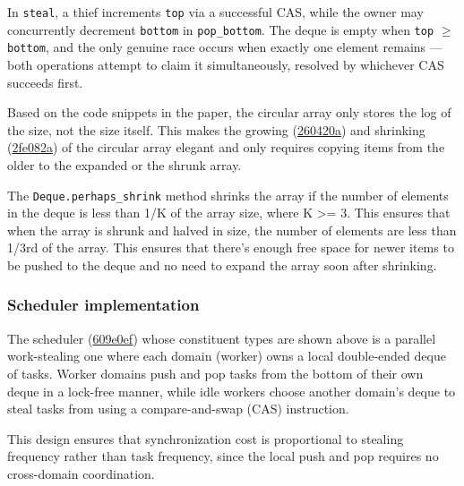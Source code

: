 \documentclass[11pt,a4paper]{article}
\begin{document}
In \texttt{steal}, a thief increments \texttt{top} via a successful CAS,
while the owner may concurrently decrement \texttt{bottom} in
\texttt{pop\_bottom}. The deque is empty when \texttt{top} $\geq$
\texttt{bottom}, and the only genuine race occurs when exactly one element
remains — both operations attempt to claim it simultaneously, resolved by
whichever CAS succeeds first.

Based on the code snippets in the \cite{chase2005dynamic} paper, the circular
array only stores the log of the size, not the size itself. This makes the growing
(\href{https://github.com/alinab/work-steal/commit/260420a59b313a634fdcb9496e3df29ce2154f57}{260420a})
and shrinking
(\href{https://github.com/alinab/work-steal/commit/2fe082af60a3d765f1bf0165bd0ab4f0415e6ab5}{2fe082a})
of the circular array elegant and only requires copying items from the older to
the expanded or the shrunk array.

The \texttt{Deque.perhaps\_shrink} method shrinks the
array if the number of elements in the deque is less than 1/K of the array size,
where K >= 3. This ensures that when the array is shrunk and halved in size, the
number of elements are less than 1/3rd of the array. This ensures that there's
enough free space for newer items to be pushed to the deque and no need to
expand the array soon after shrinking.


\subsubsection{Scheduler implementation}

The scheduler
(\href{https://github.com/alinab/work-steal/commit/609e0efc2190257ad17efd243f5e00badcbfa5fb}{609e0ef})
whose constituent types are shown above is a parallel work-stealing
one where each domain (worker) owns a local double-ended deque of tasks. Worker domains
push and pop tasks from the bottom of their own deque in a lock-free manner,
while idle workers choose another domain's deque to steal tasks from using a
compare-and-swap (CAS) instruction.

This design ensures that synchronization cost is proportional to stealing
frequency rather than task frequency, since the local push and pop requires no
cross-domain coordination.
\end{document}

